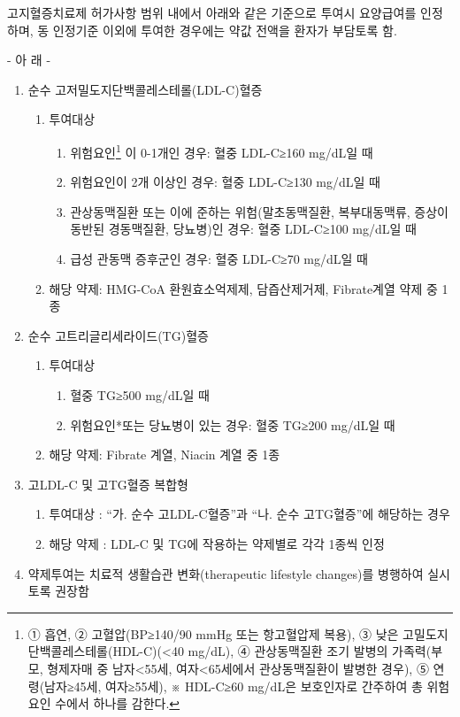 \begin{commentbox}{고지혈증치료제}
허가사항 범위 내에서 아래와 같은 기준으로 투여시 요양급여를 인정하며, 동 인정기준 이외에 투여한 경우에는 약값 전액을 환자가 부담토록 함.\par
- 아 래 -
\begin{enumerate}[가.]\tightlist
\item 순수 고저밀도지단백콜레스테롤(LDL-C)혈증
	\begin{enumerate}[1)]\tightlist
	\item 투여대상
		\begin{enumerate}\tightlist
		\item 위험요인\footnote{① 흡연, ② 고혈압(BP≥140/90 mmHg 또는 항고혈압제 복용), ③ 낮은 고밀도지단백콜레스테롤(HDL-C)(<40 mg/dL), ④ 관상동맥질환 조기 발병의 가족력(부모, 형제자매 중 남자<55세, 여자<65세에서 관상동맥질환이 발병한 경우), ⑤ 연령(남자≥45세, 여자≥55세), ※ HDL-C≥60 mg/dL은 보호인자로 간주하여 총 위험요인 수에서 하나를 감한다.}
이 0-1개인 경우: 혈중 LDL-C≥160 mg/dL일 때
		\item 위험요인이 2개 이상인 경우: 혈중 LDL-C≥130 mg/dL일 때
		\item 관상동맥질환 또는 이에 준하는 위험(말초동맥질환, 복부대동맥류, 증상이 동반된 경동맥질환, 당뇨병)인 경우: 혈중 LDL-C≥100 mg/dL일 때
		\item 급성 관동맥 증후군인 경우: 혈중 LDL-C≥70 mg/dL일 때
		\end{enumerate}
	\item 해당 약제: HMG-CoA 환원효소억제제, 담즙산제거제, Fibrate계열 약제 중 1종
	\end{enumerate}
\item 순수 고트리글리세라이드(TG)혈증
	\begin{enumerate}[1)]
	\item 투여대상
		\begin{enumerate}\tightlist
		\item 혈중 TG≥500 mg/dL일 때
		\item 위험요인*또는 당뇨병이 있는 경우: 혈중 TG≥200 mg/dL일 때
		\end{enumerate}
	\item 해당 약제: Fibrate 계열, Niacin 계열 중 1종
	\end{enumerate}
\item 고LDL-C 및 고TG혈증 복합형
	\begin{enumerate}[1)]
	\item 투여대상 : “가. 순수 고LDL-C혈증”과 “나. 순수 고TG혈증”에 해당하는 경우
	\item 해당 약제 : LDL-C 및 TG에 작용하는 약제별로 각각 1종씩 인정
	\end{enumerate}
\item 약제투여는 치료적 생활습관 변화(therapeutic lifestyle changes)를 병행하여 실시토록 권장함
\end{enumerate}
\end{commentbox} 
